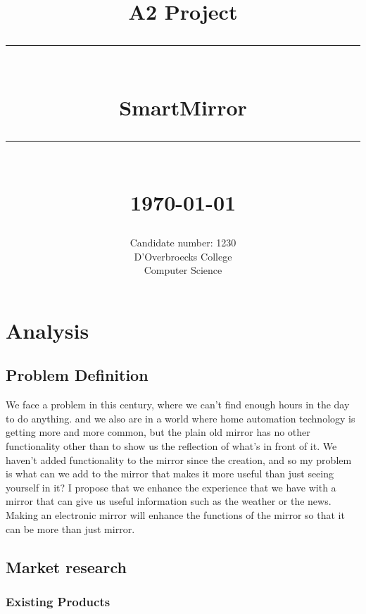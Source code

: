 \documentclass[12pt]{article}
\newcommand{\HRule}[1]{\rule{\linewidth}{#1}}
\begin{document}
    \title{ \normalsize \textsf{A2 Project}
		\\[2.0cm]
		\HRule{0.5pt} \\
		\Huge \textsf{{SmartMirror}}
		\HRule{2pt} \\[0.3cm]
		\normalsize \today \vspace*{5\baselineskip}}

    \date{}

    \author{
		Candidate number: 1230 \\
		D'Overbroecks College \\
		Computer Science }

	\maketitle
	\newpage

\tableofcontents
\newpage

    \section{Analysis}
    \subsection{Problem Definition}
       We face a problem in this century, where we can't find enough hours in the day to do anything. and we also are in a world where home automation technology is getting more and more common, but the plain old mirror has no other functionality other than to show us the reflection of what's in front of it. We haven't added functionality to the mirror since the creation, and so my problem is what can we add to the mirror that makes it more useful than just seeing yourself in it? I propose that we enhance the experience that we have with a mirror that can give us useful information such as the weather or the news. Making an electronic mirror will enhance the functions of the mirror so that it can be more than just mirror.

    \subsection{Market research}
        \subsubsection{Existing Products}
\end{document}
